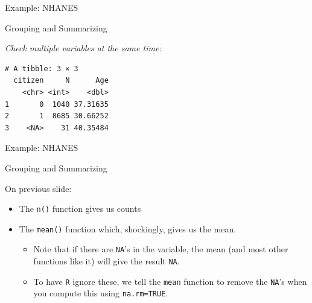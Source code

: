 \documentclass[ignorenonframetext,]{beamer}
\newenvironment{Shaded}{\begin{snugshade}}{\end{snugshade}}
\newcommand{\KeywordTok}[1]{\textcolor[rgb]{0.13,0.29,0.53}{\textbf{{#1}}}}
\newcommand{\DataTypeTok}[1]{\textcolor[rgb]{0.13,0.29,0.53}{{#1}}}
\newcommand{\StringTok}[1]{\textcolor[rgb]{0.31,0.60,0.02}{{#1}}}
\newcommand{\OtherTok}[1]{\textcolor[rgb]{0.56,0.35,0.01}{{#1}}}
\newcommand{\NormalTok}[1]{{#1}}
\providecommand{\tightlist}{%
\setlength{\itemsep}{0pt}\setlength{\parskip}{0pt}}
\begin{document}
\begin{frame}[fragile]{Example: NHANES}

\begin{block}{Grouping and Summarizing}

\emph{Check multiple variables at the same time:}

\begin{Shaded}
\end{Shaded}

\begin{verbatim}
# A tibble: 3 × 3
  citizen     N      Age
    <chr> <int>    <dbl>
1       0  1040 37.31635
2       1  8685 30.66252
3    <NA>    31 40.35484
\end{verbatim}

\end{block}

\end{frame}

\begin{frame}[fragile]{Example: NHANES}

\begin{block}{Grouping and Summarizing}

On previous slide:

\begin{itemize}
\tightlist
\item
  The \texttt{n()} function gives us counts
\item
  The \texttt{mean()} function which, shockingly, gives us the mean.

  \begin{itemize}
  \tightlist
  \item
    Note that if there are \texttt{NA}'s in the variable, the mean (and
    most other functions like it) will give the result \texttt{NA}.
  \item
    To have \texttt{R} ignore these, we tell the \texttt{mean} function
    to remove the \texttt{NA}'s when you compute this using
    \texttt{na.rm=TRUE}.
  \end{itemize}
\end{itemize}

\end{block}

\end{frame}
\end{document}

